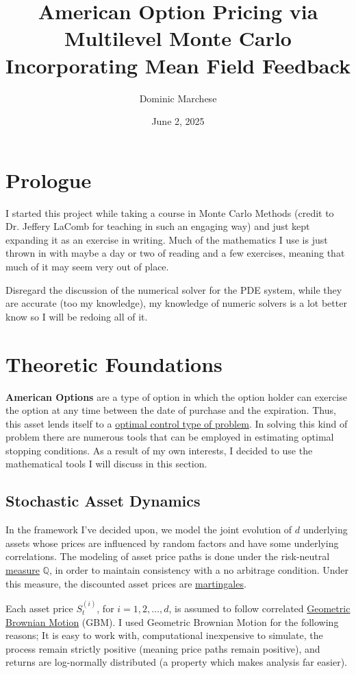 \documentclass[titlepage]{article}
\title{American Option Pricing via Multilevel Monte Carlo \\ \large Incorporating Mean Field Feedback}
\author{Dominic Marchese}
\date{June 2, 2025}
\begin{document}
\maketitle

\section{Prologue}

\quad I started this project while taking a course in Monte Carlo Methods (credit to Dr. Jeffery LaComb for teaching in such an engaging way) and just kept expanding it as an exercise in writing. Much of the mathematics I use is just thrown in with maybe a day or two of reading and a few exercises, meaning that much of it may seem very out of place.
\par Disregard the discussion of the numerical solver for the PDE system, while they are accurate (too my knowledge), my knowledge of numeric solvers is a lot better know so I will be redoing all of it.

\section{Theoretic Foundations}
\quad \textbf{American Options} are a type of option in which the option holder can exercise the option at any time between the date of purchase and the expiration. Thus, this asset lends itself to a \hyperref[sec:Optimal Stopping Problem]{optimal control type of problem}. In solving this kind of problem there are numerous tools that can be employed in estimating optimal stopping conditions. As a result of my own interests, I decided to use the mathematical tools I will discuss in this section.

\subsection{Stochastic Asset Dynamics}

In the framework I've decided upon, we model the joint evolution of \( d \) underlying assets whose prices are influenced by random factors and have some underlying correlations. The modeling of asset price paths is done under the risk-neutral \hyperref[sec:measure]{measure} \(\mathbb{Q}\), in order to maintain consistency with a no arbitrage condition. Under this measure, the discounted asset prices are \hyperref[sec:martingales]{martingales}.

Each asset price \( S_t^{(i)} \), for \( i = 1,2, \dots, d \), is assumed to follow correlated \hyperref[sec:GBM]{Geometric Brownian Motion} (GBM). I used Geometric Brownian Motion for the following reasons; It is easy to work with, computational inexpensive to simulate, the process remain strictly positive (meaning price paths remain positive), and returns are log-normally distributed (a property which makes analysis far easier).
\end{document}
